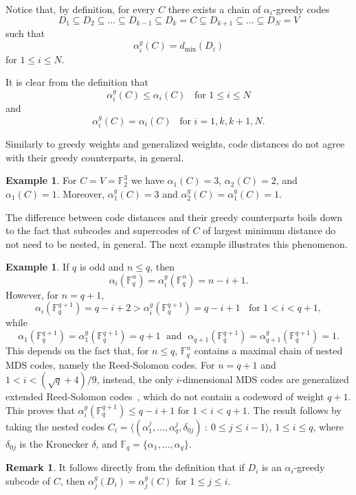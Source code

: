 \documentclass[12pt]{amsart}
\numberwithin{equation}{section}
\theoremstyle{definition}
\newtheorem{remark}[theorem]{Remark}
\newtheorem{example}[theorem]{Example}
\newcommand{\FF}{\mathbb{F}}
\begin{document}
Notice that, by definition, for every $C$ there exists a chain of $\alpha_i$-greedy codes $$D_1\subseteq D_2\subseteq\ldots\subseteq D_{k-1}\subseteq D_k=C\subseteq D_{k+1}\subseteq\ldots\subseteq D_N=V$$ such that $$\alpha_i^g(C)=d_{\min}(D_i)$$ for $1\leq i\leq N$.

It is clear from the definition that 
$$\alpha^g_i(C)\leq\alpha_i(C) \;\;
\mbox{ for } 1\leq i\leq N$$  and 
$$\alpha^g_i(C)=\alpha_i(C) \;\;\; 
\mbox{for $i=1,k,k+1,N$}.$$ 

Similarly to greedy weights and generalized weights, code distances do not agree with their greedy counterparts, in general.

\begin{example}
For $C=V=\FF_2^3$ we have $\alpha_1(C)=3$, $\alpha_2(C)=2$, and $\alpha_1(C)=1$. Moreover, $\alpha^g_1(C)=3$ and $\alpha^g_2(C)=\alpha^g_1(C)=1$.
\end{example}

The difference between code distances and their greedy counterparts boils down to the fact that subcodes and supercodes of $C$ of largest minimum distance do not need to be nested, in general. The next example illustrates this phenomenon.
\begin{example}
If $q$ is odd and $n\leq q$, then $$\alpha_i(\mathbb{F}_q^n)=\alpha_i^g(\mathbb{F}_q^n)=n-i+1.$$ However, for $n=q+1$, $$\alpha_i(\mathbb{F}_q^{q+1})=q-i+2>\alpha_i^g(\mathbb{F}_q^{q+1})=q-i+1\;\; \mbox{ for } 1<i<q+1,$$ while $$\alpha_1(\mathbb{F}_q^{q+1})=\alpha_1^g(\mathbb{F}_q^{q+1})=q+1\; \mbox{ and }\;\alpha_{q+1}(\mathbb{F}_q^{q+1})=\alpha_{q+1}^g(\mathbb{F}_q^{q+1})=1.$$
This depends on the fact that, for $n\leq q$, $\mathbb{F}_q^n$ contains a maximal chain of nested MDS codes, namely the Reed-Solomon codes. For $n=q+1$ and $1<i<(\sqrt{q}+4)/9$, instead, the only $i$-dimensional MDS codes are generalized extended Reed-Solomon codes~\cite{SR03}, which do not contain a codeword of weight $q+1$. This proves that $\alpha_i^g(\mathbb{F}_q^{q+1})\leq q-i+1$ for $1<i<q+1$. The result follows by taking the nested codes $C_i=\langle (\alpha_1^j,\ldots,\alpha_q^j,\delta_{0j})\ :\ 0\leq j\leq i-1\rangle$, $1\leq i\leq q$, where $\delta_{0j}$ is the Kronecker $\delta$, and $\mathbb{F}_q=\{\alpha_1,\ldots,\alpha_q\}$.
\end{example}

\begin{remark}
It follows directly from the definition that if $D_i$ is an $\alpha_i$-greedy subcode of $C$, then $\alpha_j^g(D_i)=\alpha_j^g(C)$ for $1\leq j\leq i$. 
\end{remark}
\end{document}
